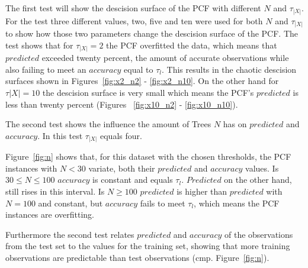 The first test will show the descision surface of the PCF
with different $N$ and $\tau_{|X|}$. For the test three
different values, two, five and ten were used for both $N$
and $\tau_{|X|}$ to show how those two parameters change
the descision surface of the PCF. The test shows that for
$\tau_{|X|} = 2$ the PCF overfitted the data, which means
that $predicted$ exceeded twenty percent, the amount of
accurate observations while also failing to meet an
$accuracy$ equal to $\tau_l$. This results in the chaotic
descision surfaces shown in Figures~\ref{fig:x2_n2} -
\ref{fig:x2_n10}. On the other hand for $\tau{|X|} = 10$
the descision surface is very small which means the PCF's
$predicted$ is less than twenty percent (Figures~%
\ref{fig:x10_n2} - \ref{fig:x10_n10}).

The second test shows the influence the amount of Trees $N$
has on $predicted$ and $accuracy$. In this test
$\tau_{|X|}$ equals four.

Figure~\ref{fig:n} shows that, for this dataset with the
chosen thresholds, the PCF instances with $N < 30$ variate,
both their $predicted$ and $accuracy$ values. Is $30 \leq N
\leq 100$ $accuracy$ is constant and equals $\tau_l$.
$Predicted$ on the other hand, still rises in this
interval. Is $N \geq 100$ $predicted$ is higher than
$predicted$ with $N = 100$ and constant, but $accuracy$
fails to meet $\tau_l$, which means the PCF instances are
overfitting.

Furthermore the second test relates $predicted$ and
$accuracy$ of the observations from the test set to the
values for the training set, showing that more training
observations are predictable than test observations
(cmp. Figure~\ref{fig:n}).




